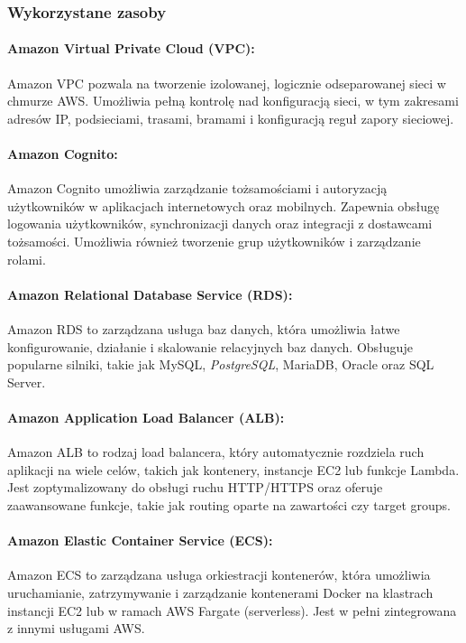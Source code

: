 \documentclass[../../main.tex]{subfiles}
\begin{document}
    \subsubsection{Wykorzystane zasoby}
        \paragraph{Amazon Virtual Private Cloud (VPC):}
        Amazon VPC pozwala na tworzenie izolowanej, logicznie odseparowanej sieci w chmurze AWS. Umożliwia pełną kontrolę nad konfiguracją sieci, w tym zakresami adresów IP, podsieciami, trasami, bramami i konfiguracją reguł zapory sieciowej.

        \paragraph{Amazon Cognito:}
        Amazon Cognito umożliwia zarządzanie tożsamościami i autoryzacją użytkowników w aplikacjach internetowych oraz mobilnych. Zapewnia obsługę logowania użytkowników, synchronizacji danych oraz integracji z dostawcami tożsamości. Umożliwia również tworzenie grup użytkowników i zarządzanie rolami.

        \paragraph{Amazon Relational Database Service (RDS):}
        Amazon RDS to zarządzana usługa baz danych, która umożliwia łatwe konfigurowanie, działanie i skalowanie relacyjnych baz danych. Obsługuje popularne silniki, takie jak MySQL, \textit{PostgreSQL}, MariaDB, Oracle oraz SQL Server.

        \paragraph{Amazon Application Load Balancer (ALB):}
        Amazon ALB to rodzaj load balancera, który automatycznie rozdziela ruch aplikacji na wiele celów, takich jak kontenery, instancje EC2 lub funkcje Lambda. Jest zoptymalizowany do obsługi ruchu HTTP/HTTPS oraz oferuje zaawansowane funkcje, takie jak routing oparte na zawartości czy target groups.

        \paragraph{Amazon Elastic Container Service (ECS):}
        Amazon ECS to zarządzana usługa orkiestracji kontenerów, która umożliwia uruchamianie, zatrzymywanie i zarządzanie kontenerami Docker na klastrach instancji EC2 lub w ramach AWS Fargate (serverless). Jest w pełni zintegrowana z innymi usługami AWS.
\end{document}
